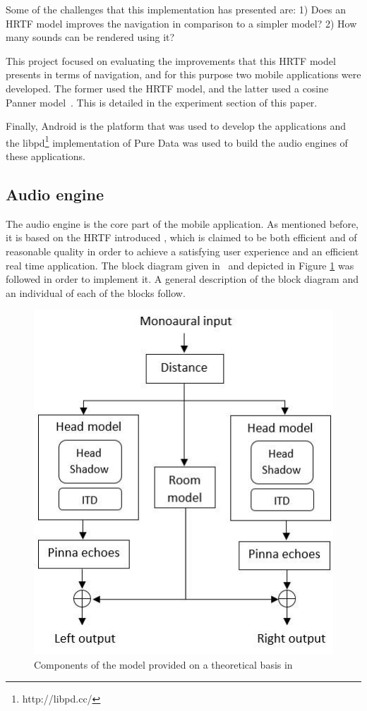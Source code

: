 \documentclass[journal]{IEEEtran}
\begin{document}
Some of the challenges that this implementation has presented are: 1) Does an HRTF model improves the navigation in comparison to a simpler model? 2) How many sounds can be rendered using it?

This project focused on evaluating the improvements that this HRTF model presents in terms of navigation, and for this purpose two mobile applications were developed. The former used the HRTF model, and the latter used a cosine Panner model~\cite{AndyFarnell2010}. This is detailed in the experiment section of this paper.

Finally, Android is the platform that was used to develop the applications and the libpd\footnote{http://libpd.cc/} implementation of Pure Data was used to build the audio engines of these applications.

\subsection{Audio engine}
The audio engine is the core part of the mobile application. As mentioned before, it is based on the HRTF introduced \cite{Brown1997}, which is claimed to be both efficient and of reasonable quality in order to achieve a satisfying user experience and an efficient real time application. The block diagram given in~\cite{Brown1997} and depicted in Figure \ref{fig:workflow} was followed in order to implement it. A general description of the block diagram and an individual of each of the blocks follow. 

\begin{figure}[h!]
  \centering
    \includegraphics[scale=0.55]{graphics/graphic.jpg}
  \caption{Components of the model provided on a theoretical basis in~\cite{Brown1997}}
  \label{fig:workflow}
\end{figure}
\end{document}
